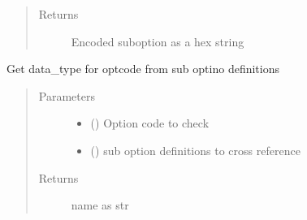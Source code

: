 \documentclass[letterpaper,10pt,english]{sphinxmanual}
\begin{document}
\begin{fulllineitems}
\begin{fulllineitems}
\begin{quote}
\begin{description}
\begin{itemize}
\end{itemize}

\item[{Returns}] \leavevmode
\sphinxAtStartPar
Encoded suboption as a hex string

\end{description}\end{quote}

\end{fulllineitems}


\begin{fulllineitems}
\label{\detokenize{dhcp_decode-class:bloxone.dhcp_decode.get_name}}
\sphinxAtStartPar
Get data\_type for optcode from sub optino definitions
\begin{quote}\begin{description}
\item[{Parameters}] \leavevmode\begin{itemize}
\item {} 
\sphinxAtStartPar
{} () \textendash{} Option code to check

\item {} 
\sphinxAtStartPar
{} () \textendash{} sub option definitions to cross
reference

\end{itemize}

\item[{Returns}] \leavevmode
\sphinxAtStartPar
name as str

\end{description}\end{quote}

\end{fulllineitems}


\begin{fulllineitems}
\label{\detokenize{dhcp_decode-class:bloxone.dhcp_decode.guess_data_type}}
\end{fulllineitems}


\end{fulllineitems}
\end{document}
